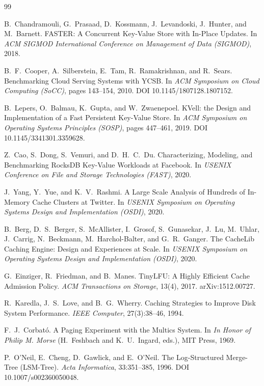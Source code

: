 \documentclass{article}
\begin{document}
\begin{thebibliography}{99}

 B.~Chandramouli, G.~Prasaad, D.~Kossmann, J.~Levandoski, J.~Hunter, and M.~Barnett.
FASTER: A Concurrent Key-Value Store with In-Place Updates.
In \emph{ACM SIGMOD International Conference on Management of Data (SIGMOD)}, 2018.

 B.~F.~Cooper, A.~Silberstein, E.~Tam, R.~Ramakrishnan, and R.~Sears.
Benchmarking Cloud Serving Systems with YCSB.
In \emph{ACM Symposium on Cloud Computing (SoCC)}, pages 143--154, 2010. DOI 10.1145/1807128.1807152.

 B.~Lepers, O.~Balmau, K.~Gupta, and W.~Zwaenepoel.
KVell: the Design and Implementation of a Fast Persistent Key-Value Store.
In \emph{ACM Symposium on Operating Systems Principles (SOSP)}, pages 447--461, 2019. DOI 10.1145/3341301.3359628.

 Z.~Cao, S.~Dong, S.~Vemuri, and D.~H.~C.~Du.
Characterizing, Modeling, and Benchmarking RocksDB Key-Value Workloads at Facebook.
In \emph{USENIX Conference on File and Storage Technologies (FAST)}, 2020.

 J.~Yang, Y.~Yue, and K.~V.~Rashmi.
A Large Scale Analysis of Hundreds of In-Memory Cache Clusters at Twitter.
In \emph{USENIX Symposium on Operating Systems Design and Implementation (OSDI)}, 2020.

 B.~Berg, D.~S.~Berger, S.~McAllister, I.~Grosof, S.~Gunasekar, J.~Lu, M.~Uhlar, J.~Carrig, N.~Beckmann, M.~Harchol-Balter, and G.~R.~Ganger.
The CacheLib Caching Engine: Design and Experiences at Scale.
In \emph{USENIX Symposium on Operating Systems Design and Implementation (OSDI)}, 2020.

 G.~Einziger, R.~Friedman, and B.~Manes.
TinyLFU: A Highly Efficient Cache Admission Policy.
\emph{ACM Transactions on Storage}, 13(4), 2017. arXiv:1512.00727.

 R.~Karedla, J.~S.~Love, and B.~G.~Wherry.
Caching Strategies to Improve Disk System Performance.
\emph{IEEE Computer}, 27(3):38--46, 1994.

 F.~J.~Corbat\'o.
A Paging Experiment with the Multics System.
In \emph{In Honor of Philip M. Morse} (H.~Feshbach and K.~U.~Ingard, eds.), MIT Press, 1969.

 P.~O'Neil, E.~Cheng, D.~Gawlick, and E.~O'Neil.
The Log-Structured Merge-Tree (LSM-Tree).
\emph{Acta Informatica}, 33:351--385, 1996. DOI 10.1007/s002360050048.


\end{thebibliography}
\end{document}
